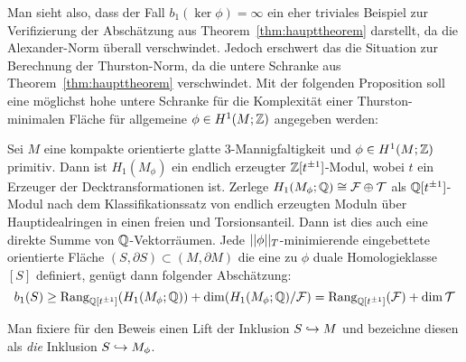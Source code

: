     Man sieht also, dass der Fall $b_1(\ker\phi)=\infty$ ein eher triviales Beispiel zur Verifizierung der Abschätzung aus Theorem~\ref{thm:haupttheorem} darstellt, da die Alexander-Norm überall verschwindet. Jedoch erschwert das die Situation zur Berechnung der Thurston-Norm, da die untere Schranke aus Theorem~\ref{thm:haupttheorem} verschwindet. Mit der folgenden Proposition soll eine möglichst hohe untere Schranke für die Komplexität einer Thurston-minimalen Fläche für allgemeine $\phi\in H^1(M;\mathbb{Z})$ angegeben werden:

    \begin{prop}
        Sei $M$ eine kompakte orientierte glatte 3-Mannigfaltigkeit und $\phi \in H^1(M;\mathbb{Z})$ primitiv. Dann ist $H_1(M_\phi)$ ein endlich erzeugter $\mathbb{Z}[t^{\pm 1}]$-Modul, wobei $t$ ein Erzeuger der Decktransformationen ist.
        Zerlege $H_1(M_\phi;\mathbb{Q})\cong \mathcal{F} \oplus \mathcal{T}$ als $\mathbb{Q}[t^{\pm 1}]$-Modul nach dem Klassifikationssatz von endlich erzeugten Moduln über Hauptidealringen in einen freien und Torsionsanteil. Dann ist dies auch eine direkte Summe von $\mathbb{Q}$-Vektorräumen. Jede $||\phi||_T$-minimierende eingebettete orientierte Fläche $(S,\partial S) \subset (M,\partial M)$ die eine zu $\phi$ duale Homologieklasse $[S]$ definiert, genügt dann folgender Abschätzung:
            \[
                b_1(S) \geq  \operatorname{Rang}_{\mathbb{Q}[t^{\pm 1}]}(H_1(M_\phi;\mathbb{Q})) + \dim(H_1(M_\phi;\mathbb{Q})/\mathcal F) = \operatorname{Rang}_{\mathbb{Q}[t^{\pm 1}]} (\mathcal F) + \dim \mathcal T
            \]
    \end{prop}
        Man fixiere für den Beweis einen Lift der Inklusion $S\hookrightarrow M$ und bezeichne diesen als \emph{die} Inklusion $S\hookrightarrow M_\phi$.
